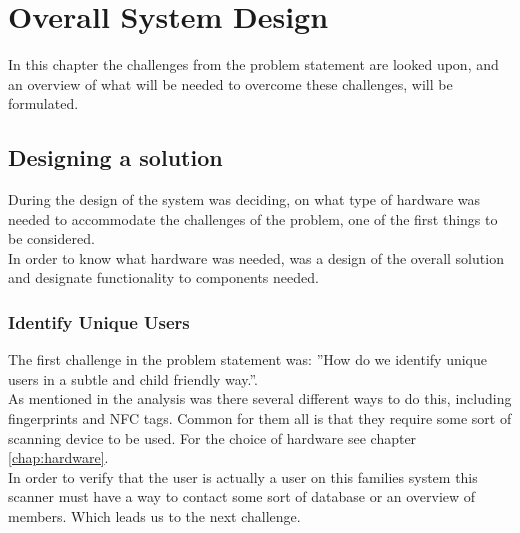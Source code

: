 \chapter{Overall System Design}
In this chapter the challenges from the problem statement are looked upon, and an overview of what will be needed to overcome these challenges, will be formulated.


\section{Designing a solution}
During the design of the system was deciding, on what type of hardware was needed to accommodate the challenges of the problem, one of the first things to be considered.\\
In order to know what hardware was needed, was a design of the overall solution and designate functionality to components needed.\\

\subsection{Identify Unique Users}
The first challenge in the problem statement was: ''How do we identify unique users in a subtle and child friendly way.''.\\
As mentioned in the analysis was there several different ways to do this, including fingerprints and NFC tags. Common for them all is that they require some sort of scanning device to be used. For the choice of hardware see chapter \ref{chap:hardware}.\\
In order to verify that the user is actually a user on this families system this scanner must have a way to contact some sort of database or an overview of members. Which leads us to the next challenge.

